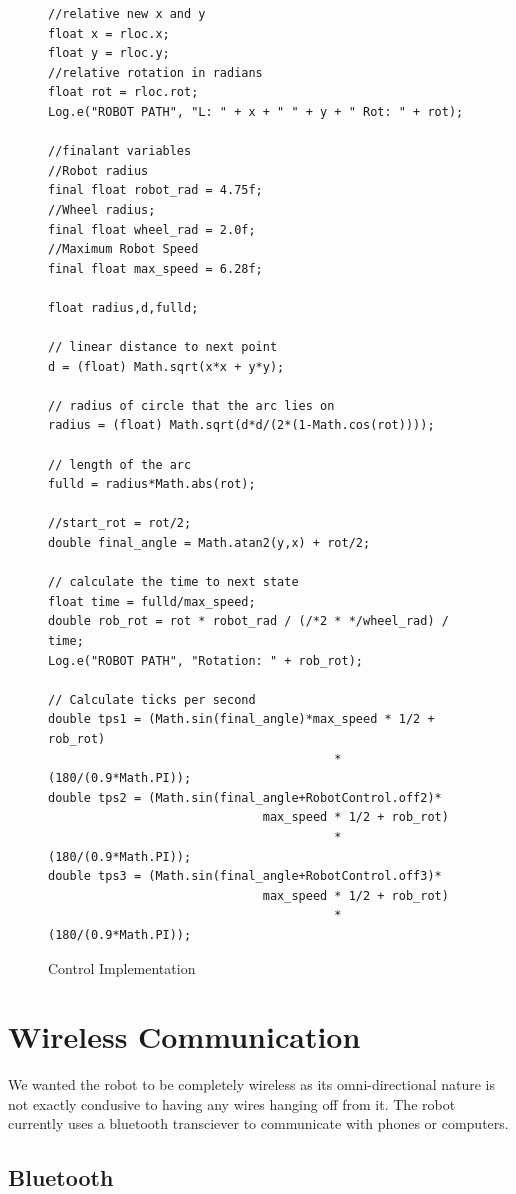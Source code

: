 \begin{figure}[H]
\begin{lstlisting}
//relative new x and y
float x = rloc.x;
float y = rloc.y;
//relative rotation in radians
float rot = rloc.rot;
Log.e("ROBOT PATH", "L: " + x + " " + y + " Rot: " + rot);

//finalant variables
//Robot radius
final float robot_rad = 4.75f;
//Wheel radius;
final float wheel_rad = 2.0f;
//Maximum Robot Speed
final float max_speed = 6.28f;

float radius,d,fulld;

// linear distance to next point
d = (float) Math.sqrt(x*x + y*y);

// radius of circle that the arc lies on
radius = (float) Math.sqrt(d*d/(2*(1-Math.cos(rot))));

// length of the arc
fulld = radius*Math.abs(rot);

//start_rot = rot/2;
double final_angle = Math.atan2(y,x) + rot/2;

// calculate the time to next state
float time = fulld/max_speed;
double rob_rot = rot * robot_rad / (/*2 * */wheel_rad) / time;
Log.e("ROBOT PATH", "Rotation: " + rob_rot);

// Calculate ticks per second
double tps1 = (Math.sin(final_angle)*max_speed * 1/2 + rob_rot) 
										* (180/(0.9*Math.PI));
double tps2 = (Math.sin(final_angle+RobotControl.off2)*
                              max_speed * 1/2 + rob_rot) 
                                        * (180/(0.9*Math.PI));
double tps3 = (Math.sin(final_angle+RobotControl.off3)*
                              max_speed * 1/2 + rob_rot) 
                                        * (180/(0.9*Math.PI));
\end{lstlisting}
\caption{Control Implementation}
\label{figure:robot_math}
\end{figure}

\section{Wireless Communication}

We wanted the robot to be completely wireless as its omni-directional nature is not exactly condusive to having any wires hanging off from it.  The robot currently uses a bluetooth transciever to communicate with phones or computers.

\subsection{Bluetooth}
\label{section:bluetooth}

